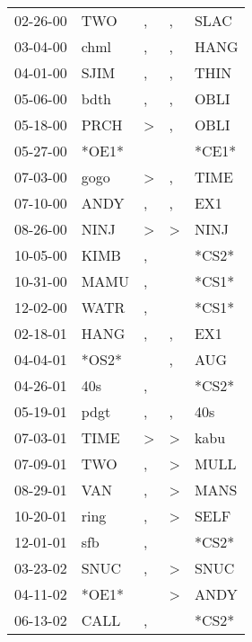 \begin{supertabular}{lllll}
 02-26-00 &    TWO &                , &                , &   SLAC \\
 03-04-00 &   chml &                , &                , &   HANG \\
 04-01-00 &   SJIM &                , &                , &   THIN \\
 05-06-00 &   bdth &                , &                , &   OBLI \\
 05-18-00 &   PRCH &     \textgreater &                , &   OBLI \\
 05-27-00 &  *OE1* &                  &                  &  *CE1* \\
 07-03-00 &   gogo &     \textgreater &                , &   TIME \\
 07-10-00 &   ANDY &                , &                , &    EX1 \\
 08-26-00 &   NINJ &     \textgreater &     \textgreater &   NINJ \\
 10-05-00 &   KIMB &                , &                  &  *CS2* \\
 10-31-00 &   MAMU &                , &                  &  *CS1* \\
 12-02-00 &   WATR &                , &                  &  *CS1* \\
 02-18-01 &   HANG &                , &                , &    EX1 \\
 04-04-01 &  *OS2* &                  &                , &    AUG \\
 04-26-01 &    40s &                , &                  &  *CS2* \\
 05-19-01 &   pdgt &                , &                , &    40s \\
 07-03-01 &   TIME &     \textgreater &     \textgreater &   kabu \\
 07-09-01 &    TWO &                , &     \textgreater &   MULL \\
 08-29-01 &    VAN &                , &     \textgreater &   MANS \\
 10-20-01 &   ring &                , &     \textgreater &   SELF \\
 12-01-01 &    sfb &                , &                  &  *CS2* \\
 03-23-02 &   SNUC &                , &     \textgreater &   SNUC \\
 04-11-02 &  *OE1* &                  &     \textgreater &   ANDY \\
 06-13-02 &   CALL &                , &                  &  *CS2* \\

\end{supertabular}
